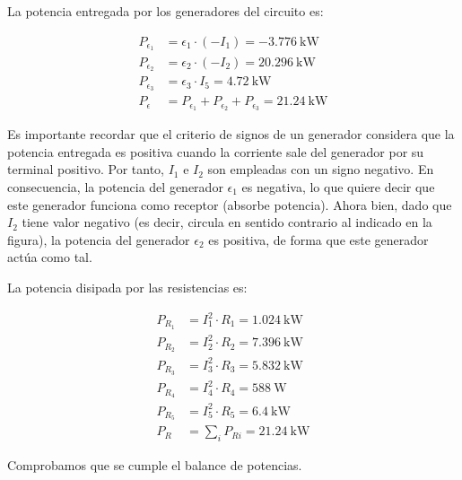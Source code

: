 \documentclass[10pt]{article}
\begin{document}
La potencia entregada por los generadores del circuito es:

\begin{align*}
  P_{\epsilon_1} &= \epsilon_1 \cdot (-I_1) = -\qty{3,776}{\kilo\watt}\\
  P_{\epsilon_2} &= \epsilon_2 \cdot (-I_2) = \qty{20,296}{\kilo\watt}\\
  P_{\epsilon_3} &= \epsilon_3 \cdot I_5 = \qty{4,72}{\kilo\watt}\\
  P_\epsilon &= P_{\epsilon_1} + P_{\epsilon_2} + P_{\epsilon_3} = \boxed{\qty{21,24}{\kilo\watt}}  
\end{align*}

Es importante recordar que el criterio de signos de un generador considera que la potencia entregada es positiva cuando la corriente sale del generador por su terminal positivo. Por tanto, $I_1$ e $I_2$ son empleadas con un signo negativo. En consecuencia, la potencia del generador $\epsilon_1$ es negativa, lo que quiere decir que este generador funciona como receptor (absorbe potencia). Ahora bien, dado que $I_2$ tiene valor negativo (es decir, circula en sentido contrario al indicado en la figura), la potencia del generador $\epsilon_2$ es positiva, de forma que este generador actúa como tal.

\vspace{3mm}

La potencia disipada por las resistencias es:

\begin{align*}
  P_{R_1} &= I_1^2 \cdot R_1 = \qty{1,024}{\kilo\watt}\\
  P_{R_2} &= I_2^2 \cdot R_2 = \qty{7,396}{\kilo\watt}\\
  P_{R_3} &= I_3^2 \cdot R_3 = \qty{5,832}{\kilo\watt}\\
  P_{R_4} &= I_4^2 \cdot R_4 = \qty{588}{\watt}\\
  P_{R_5} &= I_5^2 \cdot R_5 = \qty{6,4}{\kilo\watt}\\
  P_R &= \sum_i P_{Ri} = \boxed{\qty{21,24}{\kilo\watt}}  
\end{align*}

Comprobamos que se cumple el balance de potencias.
\end{document}
